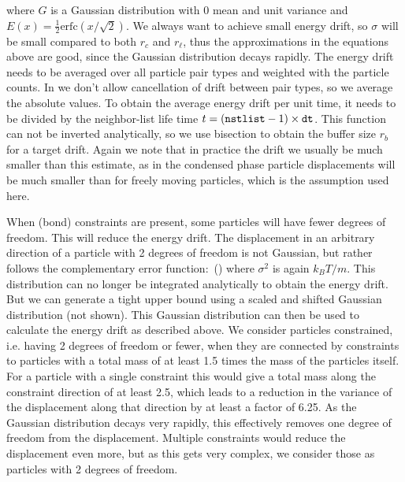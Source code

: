 {where $G$ is a Gaussian distribution with 0 mean and unit variance and
$E(x)=\frac{1}{2}\mathrm{erfc}(x/\sqrt{2})$. We always want to achieve
small energy drift, so $\sigma$ will be small compared to both $r_c$
and $r_\ell$, thus the approximations in the equations above are good,
since the Gaussian distribution decays rapidly. The energy drift needs
to be averaged over all particle pair types and weighted with the
particle counts. In {\gromacs} we don't allow cancellation of drift
between pair types, so we average the absolute values. To obtain the
average energy drift per unit time, it needs to be divided by the
neighbor-list life time $t = ({\tt nstlist} - 1)\times{\tt dt}$. This
function can not be inverted analytically, so we use bisection to
obtain the buffer size $r_b$ for a target drift.  Again we note that
in practice the drift we usually be much smaller than this estimate,
as in the condensed phase particle displacements will be much smaller
than for freely moving particles, which is the assumption used here.

When (bond) constraints are present, some particles will have fewer
degrees of freedom. This will reduce the energy drift. The
displacement in an arbitrary direction of a particle with 2 degrees of
freedom is not Gaussian, but rather follows the complementary error
function: \beq
{}\,\left(\right)
\eeq where $\sigma^2$ is again $k_B T/m$.  This distribution can no
longer be integrated analytically to obtain the energy drift. But we
can generate a tight upper bound using a scaled and shifted Gaussian
distribution (not shown). This Gaussian distribution can then be used
to calculate the energy drift as described above. We consider
particles constrained, i.e. having 2 degrees of freedom or fewer, when
they are connected by constraints to particles with a total mass of at
least 1.5 times the mass of the particles itself. For a particle with
a single constraint this would give a total mass along the constraint
direction of at least 2.5, which leads to a reduction in the variance
of the displacement along that direction by at least a factor of 6.25.
As the Gaussian distribution decays very rapidly, this effectively
removes one degree of freedom from the displacement. Multiple
constraints would reduce the displacement even more, but as this gets
very complex, we consider those as particles with 2 degrees of
freedom.

}

